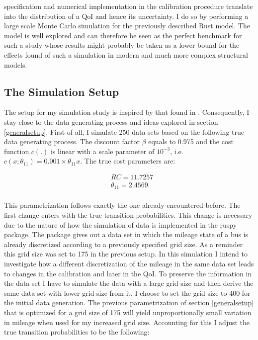 specification and numerical implementation in the calibration procedure translate into the distribution of a QoI and hence its uncertainty. I do so by performing a large scale Monte Carlo simulation for the previously described Rust model. The model is well explored and can therefore be seen as the perfect benchmark for such a study whose results might probably be taken as a lower bound for the effects found of such a simulation in modern and much more complex structural models.

\subsection{The Simulation Setup}

The setup for my simulation study is inspired by that found in \cite{Iskhakov.2016}. Consequently, I stay close to the data generating process and ideas explored in section \ref{generalsetup}. First of all, I simulate 250 data sets based on the following true data generating process. The discount factor $\beta$ equals to 0.975 and the cost function $c(.)$ is linear with a scale parameter of $10^{-3}$, i.e. $c(x; \theta_{11}) = 0.001 \times \theta_{11} x$. The true cost parameters are:

\begin{equation*}
\begin{split}
& RC = 11.7257 \\
& \theta_{11} = 2.4569 . \\
\end{split}
\end{equation*}

This parametrization follows exactly the one already encountered before. The first change enters with the true transition probabilities. This change is necessary due to the nature of how the simulation of data is implemented in the ruspy package. The package gives out a data set in which the mileage state of a bus is already discretized according to a previously specified grid size. As a reminder this grid size was set to 175 in the previous setup. In this simulation I intend to investigate how a different discretization of the mileage in the same data set leads to changes in the calibration and later in the QoI. To preserve the information in the data set I have to simulate the data with a large grid size and then derive the same data set with lower grid size from it. I choose to set the grid size to 400 for the initial data generation. The previous parametrization of section \ref{generalsetup} that is optimized for a grid size of 175 will yield unproportionally small variation in mileage when used for my increased grid size. Accounting for this I adjust the true transition probabilities to be the following:

